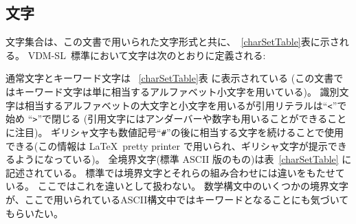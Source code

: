 \documentclass[\pformat,12pt]{jarticle}
\newcommand{\vdmsl}{VDM-SL}
\begin{document}
\subsection{文字}

文字集合は、この文書で用いられた文字形式と共に、~\ref{charSetTable}表に示される。
 \vdmsl\ 標準において文字は次のとおりに定義される:


通常文字とキーワード文字は ~\ref{charSetTable}表 に表示されている (この文書ではキーワード文字は単に相当するアルファベット小文字を用いている)。 
識別文字は相当するアルファベットの大文字と小文字を用いるが引用リテラルは``{\tt <}''で始め ``{\tt >}''で閉じる (引用文字にはアンダーバーや数字も用いることができることに注目)。 
ギリシャ文字も数値記号``{\tt \#}''の後に相当する文字を続けることで使用できる(この情報は \LaTeX\ pretty printer で用いられ、ギリシャ文字が提示できるようになっている)。 
全境界文字(標準 ASCII 版のもの)は表~\ref{charSetTable} に記述されている。
標準では境界文字とそれらの組み合わせには違いをもたせている。
ここではこれを違いとして扱わない。
数学構文中のいくつかの境界文字が、ここで用いられているASCII構文中ではキーワードとなることにも気づいてもらいたい。
\end{document}
